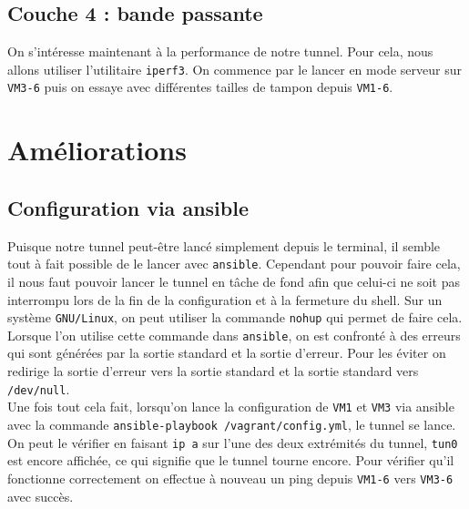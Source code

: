 \documentclass[a4paper, 12pt]{article}
\begin{document}
    \subsection{Couche 4 : bande passante}

    On s'intéresse maintenant à la performance de notre tunnel. Pour cela, nous 
    allons utiliser l'utilitaire \verb+iperf3+. On commence par le lancer en
    mode serveur sur \verb+VM3-6+ puis on essaye avec différentes tailles de 
    tampon depuis \verb+VM1-6+.

    \section{Améliorations}

    \subsection{Configuration via ansible}

    Puisque notre tunnel peut-être lancé simplement depuis le terminal, il 
    semble tout à fait possible de le lancer avec \verb+ansible+. Cependant pour
    pouvoir faire cela, il nous faut pouvoir lancer le tunnel en tâche de fond 
    afin que celui-ci ne soit pas interrompu lors de la fin de la configuration
    et à la fermeture du shell. Sur un système \verb+GNU/Linux+, on peut 
    utiliser la commande \verb+nohup+ qui permet de faire cela. \\

    Lorsque l'on utilise cette commande dans \verb+ansible+, on est confronté à 
    des erreurs qui sont générées par la sortie standard et la sortie d'erreur.
    Pour les éviter on redirige la sortie d'erreur vers la sortie standard et 
    la sortie standard vers \verb+/dev/null+. \\

    Une fois tout cela fait, lorsqu'on lance la configuration de \verb+VM1+
    et \verb+VM3+ via ansible avec la commande \verb+ansible-playbook /vagrant/config.yml+, 
    le tunnel se lance. On peut le vérifier en faisant \verb+ip a+ sur l'une
    des deux extrémités du tunnel, \verb+tun0+ est encore affichée, ce qui 
    signifie que le tunnel tourne encore. Pour vérifier qu'il fonctionne 
    correctement on effectue à nouveau un ping depuis \verb+VM1-6+ vers 
    \verb+VM3-6+ avec succès.
\end{document}
